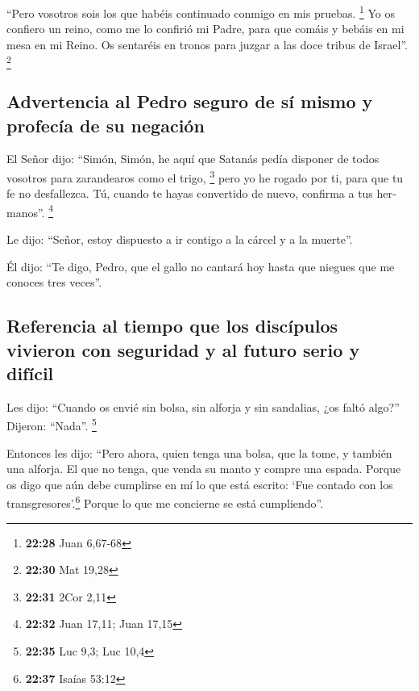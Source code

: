 \begin{paracol}{2}
\begin{otherlanguage}{english}
 ``Pero vosotros sois los que habéis continuado conmigo
en mis pruebas. \footnote{\textbf{22:28} Juan 6,67-68} 
Yo os confiero un reino, como me lo confirió mi Padre, 
para que comáis y bebáis en mi mesa en mi Reino. Os sentaréis en tronos
para juzgar a las doce tribus de Israel''. \footnote{\textbf{22:30} Mat
  19,28}

\hypertarget{advertencia-al-pedro-seguro-de-suxed-mismo-y-profecuxeda-de-su-negaciuxf3n}{%
\subsection{Advertencia al Pedro seguro de sí mismo y profecía de su
negación}\label{advertencia-al-pedro-seguro-de-suxed-mismo-y-profecuxeda-de-su-negaciuxf3n}}

 El Señor dijo: ``Simón, Simón, he aquí que Satanás pedía
disponer de todos vosotros para zarandearos como el trigo, \footnote{\textbf{22:31}
  2Cor 2,11}  pero yo he rogado por ti, para que tu fe no
desfallezca. Tú, cuando te hayas convertido de nuevo, confirma a tus
hermanos''. \footnote{\textbf{22:32} Juan 17,11; Juan 17,15}

 Le dijo: ``Señor, estoy dispuesto a ir contigo a la
cárcel y a la muerte''.

 Él dijo: ``Te digo, Pedro, que el gallo no cantará hoy
hasta que niegues que me conoces tres veces''.

\hypertarget{referencia-al-tiempo-que-los-discuxedpulos-vivieron-con-seguridad-y-al-futuro-serio-y-difuxedcil}{%
\subsection{Referencia al tiempo que los discípulos vivieron con
seguridad y al futuro serio y
difícil}\label{referencia-al-tiempo-que-los-discuxedpulos-vivieron-con-seguridad-y-al-futuro-serio-y-difuxedcil}}

 Les dijo: ``Cuando os envié sin bolsa, sin alforja y sin
sandalias, ¿os faltó algo?'' Dijeron: ``Nada''. \footnote{\textbf{22:35}
  Luc 9,3; Luc 10,4}

 Entonces les dijo: ``Pero ahora, quien tenga una bolsa,
que la tome, y también una alforja. El que no tenga, que venda su manto
y compre una espada.  Porque os digo que aún debe
cumplirse en mí lo que está escrito: `Fue contado con los
transgresores'.\footnote{\textbf{22:37} Isaías 53:12} Porque lo que me
concierne se está cumpliendo''.


\end{otherlanguage}
\end{paracol}
